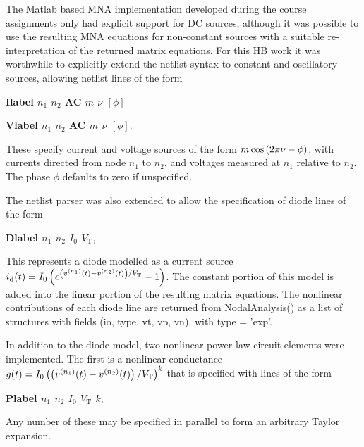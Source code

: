 
The Matlab based MNA implementation developed during the course assignments only had explicit support for DC sources, although it was possible to use the resulting MNA equations for non-constant sources with a suitable re-interpretation of the returned matrix equations.  For this HB work it was worthwhile to explicitly extend the netlist syntax to constant and oscillatory sources, allowing netlist lines of the form  

\begin{center}
\textbf{Ilabel \(n_1\) \(n_2\) AC \(m\) \(\nu\) \([\phi]\)}
\end{center}
\begin{center}
\textbf{Vlabel \(n_1\) \(n_2\) AC \(m\) \(\nu\) \([\phi]\)}.
\end{center}

These specify current and voltage sources of the form \( m \cos\left( 2 \pi \nu - \phi \right) \), with currents directed from node \( n_1 \) to \( n_2 \), and voltages measured at \( n_1 \) relative to \( n_2 \).
The phase \( \phi \) defaults to zero if unspecified.

The netlist parser was also extended to allow the specification of diode lines of the form

\begin{center}
\textbf{Dlabel \(n_1\) \(n_2\) \(I_0\) \(V_{\textrm{T}}\)},
\end{center}

This represents a diode modelled as a current source \( i_{\textrm{d}}(t) = I_0 \left( e^{ \left(v^{(n_1)}(t) - v^{(n_2)}(t)\right)/V_{\textrm{T}} } - 1 \right) \).  The constant portion of this model is added into the linear portion of the resulting matrix equations.  The nonlinear contributions of each diode line are returned from NodalAnalysis() as a list of structures with fields (io, type, vt, vp, vn), with type = 'exp'.

In addition to the diode model, two nonlinear power-law circuit elements were implemented.  The first is a nonlinear conductance \( g(t) = I_0 \left( \left(v^{(n_1)}(t) - v^{(n_2)}(t)\right)/V_{\textrm{T}}\right)^k \) that is specified with lines of the form

\begin{center}
\textbf{Plabel \(n_1\) \(n_2\) \(I_0\) \(V_{\textrm{T}}\) \( k \)},
\end{center}

Any number of these may be specified in parallel to form an arbitrary Taylor expansion.

